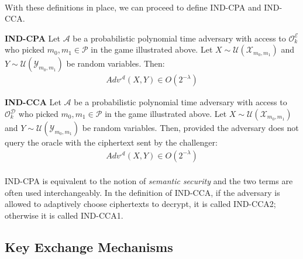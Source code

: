 \paragraph{}
With these definitions in place, we can proceed to define IND-CPA and IND-CCA.

\theoremstyle{definition}
\begin{definition}{\textbf{IND-CPA}}
Let $\mathcal{A}$ be a probabilistic polynomial time adversary with access to $\mathcal{O}_k^\mathcal{E}$ who picked $m_0, m_1 \in \mathcal{P}$ in the game illustrated above. Let $X \sim \mathcal{U}(\mathcal{X}_{m_0, m_1})$ and $Y \sim \mathcal{U}(\mathcal{Y}_{m_0, m_1})$ be random variables. Then:
\begin{align*}
Adv^\mathcal{A}(X, Y) \in O(2^{-\lambda})
\end{align*}
\end{definition}

\theoremstyle{definition}
\begin{definition}{\textbf{IND-CCA}}
Let $\mathcal{A}$ be a probabilistic polynomial time adversary with access to $\mathcal{O}_k^\mathcal{D}$ who picked $m_0, m_1 \in \mathcal{P}$ in the game illustrated above. Let $X \sim \mathcal{U}(\mathcal{X}_{m_0, m_1})$ and $Y \sim \mathcal{U}(\mathcal{Y}_{m_0, m_1})$ be random variables. Then, provided the adversary does not query the oracle with the ciphertext sent by the challenger:
\begin{align*}
Adv^\mathcal{A}(X, Y) \in O(2^{-\lambda})
\end{align*}
\end{definition}

\paragraph{}
IND-CPA is equivalent to the notion of \textit{semantic security} and the two terms are often used interchangeably. In the definition of IND-CCA, if the adversary is allowed to adaptively choose ciphertexts to decrypt, it is called IND-CCA2; otherwise it is called IND-CCA1.

\subsection{Key Exchange Mechanisms}


